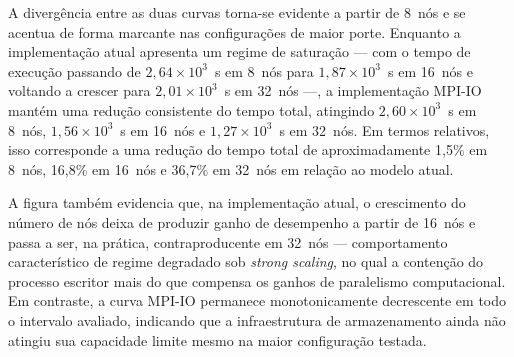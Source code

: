 A divergência entre as duas curvas torna-se evidente a partir de 8~nós e
se acentua de forma marcante nas configurações de maior porte. Enquanto a
implementação atual apresenta um regime de saturação --- com o
tempo de execução passando de $2{,}64 \times 10^{3}$~s em 8~nós para
$1{,}87 \times 10^{3}$~s em 16~nós e voltando a crescer para
$2{,}01 \times 10^{3}$~s em 32~nós ---, a implementação MPI-IO mantém
uma redução consistente do tempo total, atingindo $2{,}60 \times
10^{3}$~s em 8~nós, $1{,}56 \times 10^{3}$~s em 16~nós e $1{,}27
\times 10^{3}$~s em 32~nós. Em termos relativos, isso corresponde a uma
redução do tempo total de aproximadamente 1{,}5\% em 8~nós, 16{,}8\% em
16~nós e 36{,}7\% em 32~nós em relação ao modelo atual.

A figura também evidencia que, na implementação atual, o
crescimento do número de nós deixa de produzir ganho de desempenho a
partir de 16~nós e passa a ser, na prática, contraproducente em 32~nós
--- comportamento característico de regime degradado sob \textit{strong
scaling}, no qual a contenção do processo escritor mais do que compensa
os ganhos de paralelismo computacional. Em contraste, a curva
MPI-IO permanece monotonicamente decrescente em todo o intervalo
avaliado, indicando que a infraestrutura de armazenamento ainda não
atingiu sua capacidade limite mesmo na maior configuração testada.


